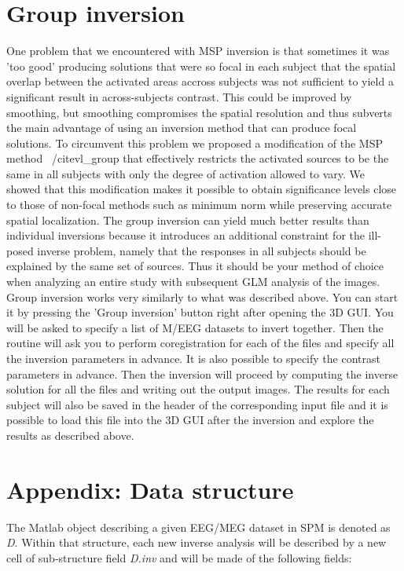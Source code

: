 \section{Group inversion}
One problem that we encountered with MSP inversion is that sometimes it was 'too good' producing solutions that were so focal in each subject that the spatial overlap between the activated
areas accross subjects was not sufficient to yield a significant result in across-subjects contrast. This could be improved by smoothing, but smoothing compromises the spatial resolution
and thus subverts the main advantage of using an inversion method that can produce focal solutions. To circumvent this problem we proposed a modification of the MSP method ~/cite{vl\_group}
that effectively restricts the activated sources to be the same in all subjects with only the degree of activation allowed to vary. We showed that this modification makes it possible to 
obtain significance levels close to those of non-focal methods such as minimum norm while preserving accurate spatial localization. The group inversion can yield much better results
than individual inversions because it introduces an additional constraint for the ill-posed inverse problem, namely that the responses in all subjects should be explained 
by the same set of sources. Thus it should be your method of choice when analyzing an entire study with subsequent GLM analysis of the images. Group inversion works very similarly to
what was described above. You can start it by pressing the 'Group inversion' button right after opening the 3D GUI. You will be asked to specify a list of M/EEG datasets to invert together.
Then the routine will ask you to perform coregistration for each of the files and specify all the inversion parameters in advance. It is also possible to specify the contrast parameters in advance.
Then the inversion will proceed by computing the inverse solution for all the files and writing out the output images. The results for each subject will also be saved in the header 
of the corresponding input file and it is possible to load this file into the 3D GUI after the inversion and explore the results as described above. 

\section{Appendix: Data structure}
The Matlab object describing a given EEG/MEG dataset in SPM is denoted as \textit{D}. 
Within that structure, each new inverse analysis will be described by a new cell of sub-structure 
field \textit{D.inv} and will be made of the following fields:

